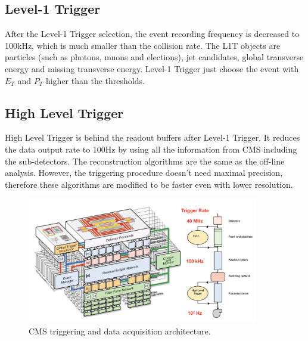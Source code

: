\subsection*{Level-1 Trigger}
After the Level-1 Trigger selection, the event recording frequency is decreased to 100kHz\cite{L1T}, which is much smaller than the collision rate. The L1T objects are particles (such as photons, muons and elections), jet candidates, global transverse energy and missing transverse energy. Level-1 Trigger just choose the event with $E_{T}$ and $P_{T}$ higher than the thresholds.

\subsection*{High Level Trigger}
High Level Trigger is behind the readout buffers after Level-1 Trigger. It reduces the data output rate to 100Hz by using all the information from CMS including the sub-detectors. The reconstruction algorithms are the same as the off-line analysis. However, the triggering procedure doesn't need maximal precision, therefore these algorithms are modified to be faster even with lower resolution.\\

\begin{figure}[hbtp]
  \begin{center}
    \includegraphics[width=0.9\textwidth]{figure/CH2/trigger.png}
  \end{center}
  \caption{\label{fig:trigger}CMS triggering and data acquisition architecture.}
\end{figure}
